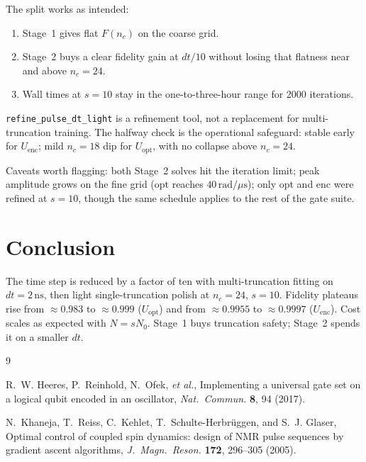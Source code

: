 \documentclass[11pt]{article}
\begin{document}
The split works as intended:
\begin{enumerate}
  \item Stage~1 gives flat $F(n_c)$ on the coarse grid.
  \item Stage~2 buys a clear fidelity gain at $dt/10$ without losing that
        flatness near and above $n_c=24$.
  \item Wall times at $s=10$ stay in the one-to-three-hour range for 2000
        iterations.
\end{enumerate}

\texttt{refine\_pulse\_dt\_light} is a refinement tool, not a replacement for
multi-truncation training. The halfway check is the operational safeguard:
stable early for $U_{\mathrm{enc}}$; mild $n_c=18$ dip for $U_{\mathrm{opt}}$,
with no collapse above $n_c=24$.

Caveats worth flagging: both Stage~2 solves hit the iteration limit; peak
amplitude grows on the fine grid (opt reaches $40\,\mathrm{rad}/\mu\mathrm{s}$);
only opt and enc were refined at $s=10$, though the same schedule applies to
the rest of the gate suite.

\section{Conclusion}
\label{sec:conclusion}

The time step is reduced by a factor of ten with multi-truncation fitting on
$dt=2\,\mathrm{ns}$, then light single-truncation polish at $n_c=24$,
$s=10$. Fidelity plateaus rise from $\approx 0.983$ to $\approx 0.999$
($U_{\mathrm{opt}}$) and from $\approx 0.9955$ to $\approx 0.9997$
($U_{\mathrm{enc}}$). Cost scales as expected with $N=sN_0$. Stage~1 buys
truncation safety; Stage~2 spends it on a smaller $dt$.

\begin{thebibliography}{9}

R.~W. Heeres, P.~Reinhold, N.~Ofek, \emph{et al.},
Implementing a universal gate set on a logical qubit encoded in an oscillator,
\emph{Nat.\ Commun.} \textbf{8}, 94 (2017).

N.~Khaneja, T.~Reiss, C.~Kehlet, T.~Schulte-Herbr\"uggen, and S.~J. Glaser,
Optimal control of coupled spin dynamics: design of NMR pulse sequences by
gradient ascent algorithms,
\emph{J.\ Magn.\ Reson.} \textbf{172}, 296--305 (2005).

\end{thebibliography}
\end{document}
